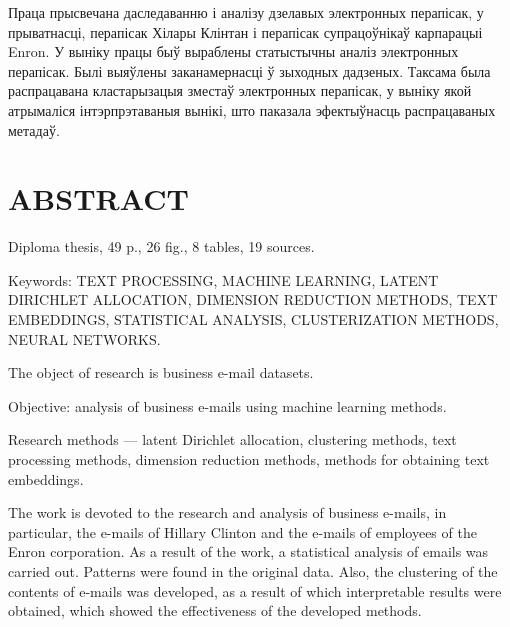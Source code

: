 Праца прысвечана даследаванню і аналізу дзелавых электронных перапісак, у прыватнасці, перапісак Хілары Клінтан і перапісак супрацоўнікаў карпарацыі Enron. У выніку працы быў выраблены статыстычны аналіз электронных перапісак. Былі выяўлены заканамернасці ў зыходных дадзеных. Таксама была распрацавана кластарызацыя зместаў электронных перапісак, у выніку якой атрымаліся інтэрпрэтаваныя вынікі, што паказала эфектыўнасць распрацаваных метадаў.



\chapter*{ABSTRACT}

Diploma thesis, 49 p., 26 fig., 8 tables, 19 sources.

Keywords: TEXT PROCESSING, MACHINE LEARNING, LATENT DIRICHLET ALLOCATION, DIMENSION REDUCTION METHODS, TEXT EMBEDDINGS, STATISTICAL ANALYSIS, CLUSTERIZATION METHODS, NEURAL NETWORKS.

\vspace{1.5 ex}
The object of research is business e-mail datasets.

Objective: analysis of business e-mails using machine learning methods.

Research methods --- latent Dirichlet allocation, clustering methods, text processing methods, dimension reduction methods, methods for obtaining text embeddings.

The work is devoted to the research and analysis of business e-mails, in particular, the e-mails of Hillary Clinton and the e-mails of employees of the Enron corporation. As a result of the work, a statistical analysis of emails was carried out. Patterns were found in the original data. Also, the clustering of the contents of e-mails was developed, as a result of which interpretable results were obtained, which showed the effectiveness of the developed methods.
